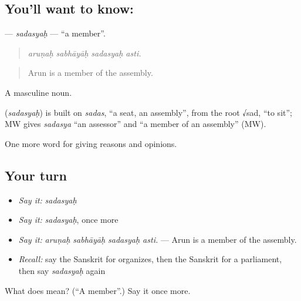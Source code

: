 \subsection*{You'll want to know: }
\textbf{} — \emph{sadasyaḥ} — \textquotedblleft{}a member\textquotedblright{}.

\begin{quote}
   
\end{quote}

\begin{quote}
\emph{aruṇaḥ sabhāyāḥ sadasyaḥ asti.}
\end{quote}

\begin{quote}
Arun is a member of the assembly.
\end{quote}

A masculine noun.

\begin{cousinweb}
\textbf{} (\emph{sadasyaḥ}) is built on \emph{sadas}, \textquotedblleft{}a seat, an assembly\textquotedblright{}, from the root √sad, \textquotedblleft{}to sit\textquotedblright{}; MW gives \emph{sadasya} \textquotedblleft{}an assessor\textquotedblright{} and \textquotedblleft{}a member of an assembly\textquotedblright{} (MW).
\end{cousinweb}

\begin{grammarlens}[title={What you've built}]
One more word for giving reasons and opinions.
\end{grammarlens}

\subsection*{Your turn}
\begin{itemize}
\raggedright
  \item \emph{Say it:} \emph{sadasyaḥ}
  \item \emph{Say it:} \emph{sadasyaḥ}, once more
  \item \emph{Say it:} \emph{aruṇaḥ sabhāyāḥ sadasyaḥ asti.} — Arun is a member of the assembly.
  \item \emph{Recall:} say the Sanskrit for organizes, then the Sanskrit for a parliament, then say \emph{sadasyaḥ} again
\end{itemize}

\begin{tcolorbox}[breakable,colback=teal!4,colframe=teal!35!black,title={Before you move on}]
What does  mean? (\textquotedblleft{}A member\textquotedblright{}.) Say it once more.
\end{tcolorbox}
